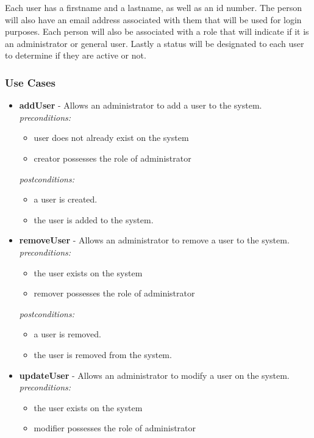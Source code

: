 \documentclass[a4paper,12pt]{article}
\begin{document}
	{\noindent}Each user has a firstname and a lastname, as well as an id number. The person will also have an email address associated with them that will be used for login purposes. Each person will also be associated with a role that will indicate if it is an administrator or general user. Lastly a status will be designated to each user to determine if they are active or not.	
	 
	\newpage
	\subsubsection{Use Cases}
	
	\begin{itemize}
		\item \textbf{addUser} - Allows an administrator to add a user to the system.\\[0.5cm]
		\textit{preconditions:}
			\begin{itemize}
				\item user does not already exist on the system
				\item creator possesses the role of administrator
			\end{itemize}
			
		\textit{postconditions:}
			\begin{itemize}
				\item a user is created.
				\item the user is added to the system.\\[0.5cm]
			\end{itemize}
			
		\item \textbf{removeUser} - Allows an administrator to remove a user to the system.\\[0.5cm]
		\textit{preconditions:}
			\begin{itemize}
				\item the user exists on the system
				\item remover possesses the role of administrator
			\end{itemize}
		
		\textit{postconditions:}
			\begin{itemize}
				\item a user is removed.
				\item the user is removed from the system.\\[0.5cm]
			\end{itemize}
			
		\item \textbf{updateUser} - Allows an administrator to modify a user on the system.\\[0.5cm]
		\textit{preconditions:}
			\begin{itemize}
				\item the user exists on the system
				\item modifier possesses the role of administrator
			\end{itemize}
		

\end{itemize}
\end{document}
